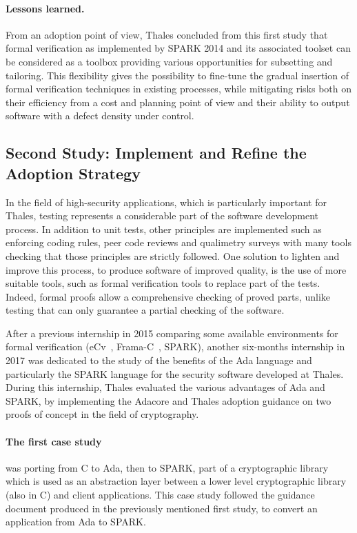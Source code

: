 \documentclass{eceasst}
\begin{document}
\paragraph{Lessons learned.}
From an adoption point of view, Thales concluded from this first study that
formal verification as implemented by SPARK 2014 and its associated toolset can
be considered as a toolbox providing various opportunities for subsetting and
tailoring. This flexibility gives the possibility to fine-tune the gradual
insertion of formal verification techniques in existing processes, while
mitigating risks both on their efficiency from a cost and planning point of
view and their ability to output software with a defect density under control.

\subsection{Second Study: Implement and Refine the Adoption Strategy}

In the field of high-security applications, which is particularly important for
Thales, testing represents a considerable part of the software development
process. In addition to unit tests, other principles are implemented such as
enforcing coding rules, peer code reviews and qualimetry surveys with many
tools checking that those principles are strictly followed. One solution to
lighten and improve this process, to produce software of improved quality, is
the use of more suitable tools, such as formal verification tools to replace
part of the tests. Indeed, formal proofs allow a comprehensive checking of
proved parts, unlike testing that can only guarantee a partial checking of the
software.

After a previous internship in 2015 comparing some available environments for formal
verification (eCv~\cite{Crocker2014CMS}, Frama-C~\cite{Kirchner2015}, SPARK),
another six-months internship in 2017 was dedicated to the study of the
benefits of the Ada language and particularly the SPARK language for the
security software developed at Thales. During this internship, Thales evaluated the various advantages of Ada and
SPARK, by implementing the Adacore and Thales adoption guidance on two proofs
of concept in the field of cryptography.

\paragraph{The first case study} was porting from C to Ada, then to SPARK, part of a
cryptographic library which is used as an abstraction layer between a lower
level cryptographic library (also in C) and client applications. This case study
followed the guidance document produced in the previously mentioned first
study, to convert an application from Ada to SPARK.
\end{document}
